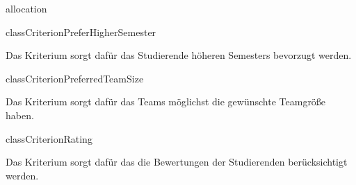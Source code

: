 \begin{texdocpackage}{allocation}
\begin{texdocclass}{class}{CriterionPreferHigherSemester}
\label{texdoclet:allocation.CriterionPreferHigherSemester}
\begin{texdocclassintro}
Das Kriterium sorgt dafür das Studierende höheren Semesters bevorzugt werden.\end{texdocclassintro}
\begin{texdocclassconstructors}
\end{texdocclassconstructors}
\begin{texdocclassmethods}
\end{texdocclassmethods}
\end{texdocclass}


\begin{texdocclass}{class}{CriterionPreferredTeamSize}
\label{texdoclet:allocation.CriterionPreferredTeamSize}
\begin{texdocclassintro}
Das Kriterium sorgt dafür das Teams möglichst die gewünschte Teamgröße haben.\end{texdocclassintro}
\begin{texdocclassconstructors}
\end{texdocclassconstructors}
\begin{texdocclassmethods}
\end{texdocclassmethods}
\end{texdocclass}


\begin{texdocclass}{class}{CriterionRating}
\label{texdoclet:allocation.CriterionRating}
\begin{texdocclassintro}
Das Kriterium sorgt dafür das die Bewertungen der Studierenden berücksichtigt
 werden.\end{texdocclassintro}
\begin{texdocclassconstructors}
\end{texdocclassconstructors}
\begin{texdocclassmethods}
\end{texdocclassmethods}
\end{texdocclass}



\end{texdocpackage}
